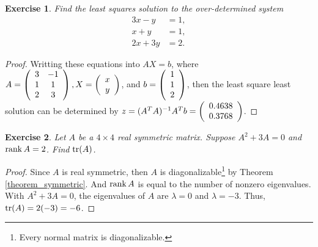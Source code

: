\documentclass[11pt]{book}
\newtheorem{exercise}{Exercise}[section]
\theoremstyle{definition}
\numberwithin{equation}{chapter}
\begin{document}
\begin{exercise}
Find the least squares solution to the over-determined system%
\begin{align*}
3x-y  &  =1,\\
x+y  &  =1,\\
2x+3y  &  =2.
\end{align*}
\end{exercise}
\begin{proof}
Writting these equations into $AX=b$, where $A = \left(\begin{array}
    [c]{cc}%
    3 & -1\\
    1 & 1\\
    2 & 3
    \end{array}\right), X = \left(\begin{array}
    [c]{c}%
    x\\
    y\\
    \end{array}\right)$, and $b = \left(\begin{array}
    [c]{c}%
    1\\
    1\\
    2
    \end{array}\right)$, then the least square least solution can be determined by $z = (A^TA)^{-1}A^T b = \left(\begin{array}
    [c]{c}%
    0.4638\\
    0.3768\\
    \end{array}\right)
    $.
\end{proof}

\medskip

\begin{exercise}{\bf *}
Let $A$ be a $4 \times 4$ real symmetric matrix. Suppose $A^2 + 3A = 0$ and $\rank A = 2$. Find ${\rm tr}(A)$.
\end{exercise}
\begin{proof}
Since $A$ is real symmetric, then $A$ is diagonalizable\footnote{Every normal matrix is diagonalizable\cite{21}.} by Theorem \ref{theorem_symmetric}. And $\rank A$ is equal to the number of nonzero eigenvalues. With $A^2 + 3A = 0$, the eigenvalues of $A$ are $\lambda = 0$ and $\lambda = -3$. Thus, ${\rm tr}(A) = 2(-3) = -6$.
\end{proof}

\medskip
\end{document}
